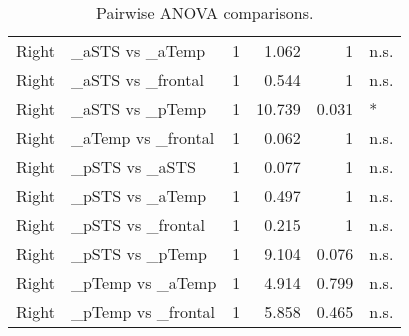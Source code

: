 \begin{table}[h]
\begin{tabular}{llrrrl}
 Right        & \_aSTS vs \_aTemp    &    1 &    1.062 &     1     & n.s.   \\
 Right        & \_aSTS vs \_frontal  &    1 &    0.544 &     1     & n.s.   \\
 Right        & \_aSTS vs \_pTemp    &    1 &   10.739 &     0.031 & *      \\
 Right        & \_aTemp vs \_frontal &    1 &    0.062 &     1     & n.s.   \\
 Right        & \_pSTS vs \_aSTS     &    1 &    0.077 &     1     & n.s.   \\
 Right        & \_pSTS vs \_aTemp    &    1 &    0.497 &     1     & n.s.   \\
 Right        & \_pSTS vs \_frontal  &    1 &    0.215 &     1     & n.s.   \\
 Right        & \_pSTS vs \_pTemp    &    1 &    9.104 &     0.076 & n.s.   \\
 Right        & \_pTemp vs \_aTemp   &    1 &    4.914 &     0.799 & n.s.   \\
 Right        & \_pTemp vs \_frontal &    1 &    5.858 &     0.465 & n.s.   \\
\bottomrule
\end{tabular}
\caption{Pairwise ANOVA comparisons.}
\end{table}